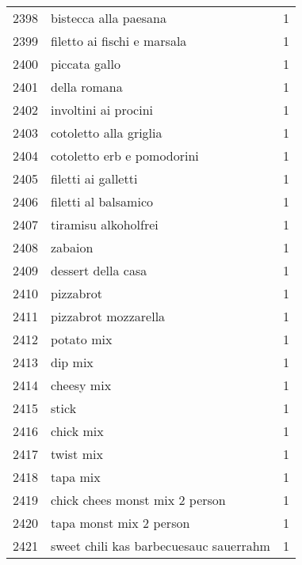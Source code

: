 \begin{tabular}{llr}
2398 &                              bistecca alla paesana &      1 \\
2399 &                        filetto ai fischi e marsala &      1 \\
2400 &                                      piccata gallo &      1 \\
2401 &                                       della romana &      1 \\
2402 &                               involtini ai procini &      1 \\
2403 &                             cotoletto alla griglia &      1 \\
2404 &                         cotoletto erb e pomodorini &      1 \\
2405 &                                filetti ai galletti &      1 \\
2406 &                               filetti al balsamico &      1 \\
2407 &                               tiramisu alkoholfrei &      1 \\
2408 &                                            zabaion &      1 \\
2409 &                                 dessert della casa &      1 \\
2410 &                                          pizzabrot &      1 \\
2411 &                               pizzabrot mozzarella &      1 \\
2412 &                                         potato mix &      1 \\
2413 &                                            dip mix &      1 \\
2414 &                                         cheesy mix &      1 \\
2415 &                                              stick &      1 \\
2416 &                                          chick mix &      1 \\
2417 &                                          twist mix &      1 \\
2418 &                                           tapa mix &      1 \\
2419 &                     chick chees monst mix 2 person &      1 \\
2420 &                            tapa monst mix 2 person &      1 \\
2421 &             sweet chili kas barbecuesauc sauerrahm &      1 \\

\end{tabular}
